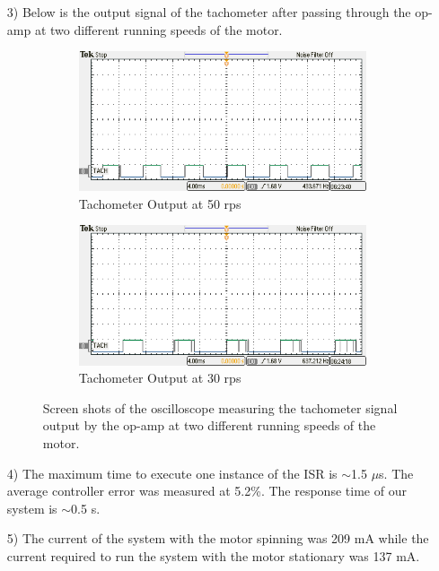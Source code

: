 \documentclass{article}
\begin{document}
\begin{enumerate}
		\item[3)]
			Below is the output signal of the tachometer after passing through the op-amp at two different running speeds of the motor.
			\centering		
			\begin{figure}[h]
				\centering
				\begin{subfigure}{0.45\textwidth}
					\includegraphics[keepaspectratio, width=\textwidth]{Lab4Graphics/TachMeasurement1}
					\caption{Tachometer Output at 50 rps}
					\label{fig:SS_TachMeasure1}
				\end{subfigure}
				\hfill
				\begin{subfigure}{0.45\textwidth}
					\includegraphics[keepaspectratio, width=\textwidth]{Lab4Graphics/TachMeasurement2}	
					\caption{Tachometer Output at 30 rps}
					\label{fig:SS_TachMeasure2}
				\end{subfigure}
				\caption{Screen shots of the oscilloscope measuring the tachometer signal output by the op-amp at two different running speeds of the motor.}
				\label{fig:SS_B&C}			
				\hfill		
			\end{figure}
			\raggedright		

		\item[4)]
			The maximum time to execute one instance of the ISR is $\sim$1.5 $\mu$s. The average controller error was measured at 5.2\%. The response time of our system is $\sim$0.5 s.
			
		\item[5)]
			The current of the system with the motor spinning was 209 mA while the current required to run the system with the motor stationary was 137 mA.
	\end{enumerate}
\end{document}
